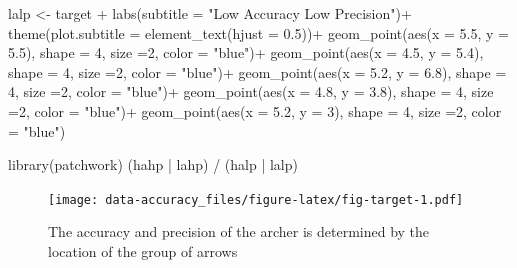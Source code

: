 \documentclass[
  letterpaper,
]{book}
\newenvironment{Shaded}{\begin{snugshade}}{\end{snugshade}}
\newcommand{\AttributeTok}[1]{\textcolor[rgb]{0.40,0.45,0.13}{#1}}
\newcommand{\DecValTok}[1]{\textcolor[rgb]{0.68,0.00,0.00}{#1}}
\newcommand{\FloatTok}[1]{\textcolor[rgb]{0.68,0.00,0.00}{#1}}
\newcommand{\FunctionTok}[1]{\textcolor[rgb]{0.28,0.35,0.67}{#1}}
\newcommand{\NormalTok}[1]{\textcolor[rgb]{0.00,0.23,0.31}{#1}}
\newcommand{\OtherTok}[1]{\textcolor[rgb]{0.00,0.23,0.31}{#1}}
\newcommand{\SpecialCharTok}[1]{\textcolor[rgb]{0.37,0.37,0.37}{#1}}
\newcommand{\StringTok}[1]{\textcolor[rgb]{0.13,0.47,0.30}{#1}}
\begin{document}
\begin{Shaded}
\begin{Highlighting}[]
\NormalTok{lalp }\OtherTok{\textless{}{-}}\NormalTok{ target }\SpecialCharTok{+}
  \FunctionTok{labs}\NormalTok{(}\AttributeTok{subtitle =} \StringTok{"Low Accuracy Low Precision"}\NormalTok{)}\SpecialCharTok{+}
  \FunctionTok{theme}\NormalTok{(}\AttributeTok{plot.subtitle =} \FunctionTok{element\_text}\NormalTok{(}\AttributeTok{hjust =} \FloatTok{0.5}\NormalTok{))}\SpecialCharTok{+}
  \FunctionTok{geom\_point}\NormalTok{(}\FunctionTok{aes}\NormalTok{(}\AttributeTok{x =} \FloatTok{5.5}\NormalTok{, }\AttributeTok{y =} \FloatTok{5.5}\NormalTok{), }\AttributeTok{shape =} \DecValTok{4}\NormalTok{, }\AttributeTok{size =}\DecValTok{2}\NormalTok{, }\AttributeTok{color =} \StringTok{"blue"}\NormalTok{)}\SpecialCharTok{+}
  \FunctionTok{geom\_point}\NormalTok{(}\FunctionTok{aes}\NormalTok{(}\AttributeTok{x =} \FloatTok{4.5}\NormalTok{, }\AttributeTok{y =} \FloatTok{5.4}\NormalTok{), }\AttributeTok{shape =} \DecValTok{4}\NormalTok{, }\AttributeTok{size =}\DecValTok{2}\NormalTok{, }\AttributeTok{color =} \StringTok{"blue"}\NormalTok{)}\SpecialCharTok{+}
  \FunctionTok{geom\_point}\NormalTok{(}\FunctionTok{aes}\NormalTok{(}\AttributeTok{x =} \FloatTok{5.2}\NormalTok{, }\AttributeTok{y =} \FloatTok{6.8}\NormalTok{), }\AttributeTok{shape =} \DecValTok{4}\NormalTok{, }\AttributeTok{size =}\DecValTok{2}\NormalTok{, }\AttributeTok{color =} \StringTok{"blue"}\NormalTok{)}\SpecialCharTok{+}
  \FunctionTok{geom\_point}\NormalTok{(}\FunctionTok{aes}\NormalTok{(}\AttributeTok{x =} \FloatTok{4.8}\NormalTok{, }\AttributeTok{y =} \FloatTok{3.8}\NormalTok{), }\AttributeTok{shape =} \DecValTok{4}\NormalTok{, }\AttributeTok{size =}\DecValTok{2}\NormalTok{, }\AttributeTok{color =} \StringTok{"blue"}\NormalTok{)}\SpecialCharTok{+}
  \FunctionTok{geom\_point}\NormalTok{(}\FunctionTok{aes}\NormalTok{(}\AttributeTok{x =} \FloatTok{5.2}\NormalTok{, }\AttributeTok{y =} \DecValTok{3}\NormalTok{), }\AttributeTok{shape =} \DecValTok{4}\NormalTok{, }\AttributeTok{size =}\DecValTok{2}\NormalTok{, }\AttributeTok{color =} \StringTok{"blue"}\NormalTok{)}


\FunctionTok{library}\NormalTok{(patchwork)}
\NormalTok{(hahp }\SpecialCharTok{|}\NormalTok{ lahp) }\SpecialCharTok{/}
\NormalTok{(halp }\SpecialCharTok{|}\NormalTok{ lalp)}
\end{Highlighting}
\end{Shaded}

\begin{figure}

{\centering \texttt{[image: data-accuracy\_files/figure-latex/fig-target-1.pdf]}

}

\caption{\label{fig-target}The accuracy and precision of the archer is
determined by the location of the group of arrows}

\end{figure}
\end{document}

